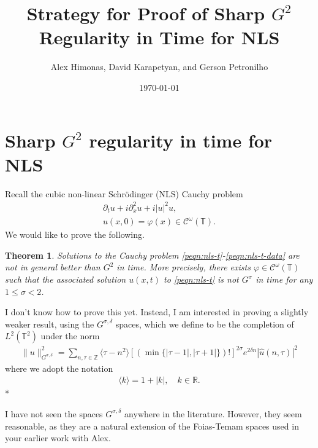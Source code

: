 \documentclass[12pt,reqno]{amsart}
\numberwithin{equation}{section}  %
\newcommand{\rr}{\mathbb{R}}
\newcommand{\zz}{\mathbb{Z}}
\newcommand{\ci}{\mathbb{T}}
\newcommand{\wh}{\widehat}
\newcommand{\vp}{\varphi}
\newtheorem{theorem}{Theorem}[section]
\begin{document}
\title{Strategy for Proof of Sharp $G^{2}$ Regularity in Time for NLS}
\author{Alex Himonas, David Karapetyan, and Gerson Petronilho}
\date{\today}
%
\maketitle
%
%
%
%
%
%
\section{Sharp $G^2$ regularity in time for NLS} 
\label{pg2-rreg-3}
%
%
Recall the cubic non-linear Schr\"odinger (NLS) Cauchy problem 
%
%
\begin{gather}
  \label{peqn:nls-t}
  \partial_{t}u + i\partial_{x}^2u+i |u|^2u,
  \\
  \label{peqn:nls-t-data}
  u(x,0)=\varphi(x) \in \mathcal{C}^\omega(\mathbb{T}).
\end{gather}
%
We would like to
prove the following.
%
%
%
%
%                
%
%
%
%
\begin{theorem}
  Solutions to the Cauchy problem \eqref{peqn:nls-t}-\eqref{peqn:nls-t-data}
  are not in general better than $G^{2}$ in time. More precisely, there exists
  $\vp \in  \mathcal{C}^\omega(\mathbb{T})$ such that the associated solution
  $u(x,t)$ to \eqref{peqn:nls-t} is not $G^{\sigma}$ in time for any $1 \le \sigma <
  2$. 
\label{thm:sharp}
\end{theorem}
%
%
I don't know how to prove this yet. Instead, I am interested in proving a slightly
weaker result, using the $G^{\sigma, \delta}$ spaces,
which we define to be the completion
of $L^{2}(\ci^{2})$ under the norm
%
%
\begin{equation*}
  \begin{split}
    \| u \|^{2}_{G^{\sigma, \delta}} = \sum_{n, \tau \in \zz} \langle
    \tau - n^{2} \rangle  [(\min \{ |\tau -1 |, |\tau + 1| \})!]^{2 \sigma}
    e^{2 \delta n} | \wh{u}(n, \tau) |^{2} 
  \end{split}
\end{equation*}
%
where we adopt the notation
%
%
\begin{equation*}
  \begin{split}
    \langle k \rangle  = 1 + | k |, \quad k \in \rr.
  \end{split}
\end{equation*}
%
*
\begin{framed}
  I have not seen the spaces $G^{\sigma, \delta}$ anywhere in the
  literature. However, they seem reasonable, as they are a natural extension of
  the Foias-Temam spaces used in your earlier work with Alex.
\end{framed}
\end{document}
